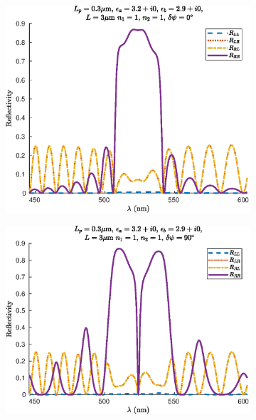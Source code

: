 \begin{figure}
	\centering
	\begin{subfigure}{0.49\linewidth}
		\includegraphics[width=\linewidth]{plots/defect/no_defect/oseen_reflection}
		\caption{}
		\label{fig:defect_reflectivity:reflect_nodefect}
	\end{subfigure}
	\begin{subfigure}{0.49\linewidth}
		\includegraphics[width=\linewidth]{plots/defect/reflectivity/oseen_reflection}
		\caption{}
		\label{fig:defect_reflectivity:reflect}
	\end{subfigure}

\end{figure}

